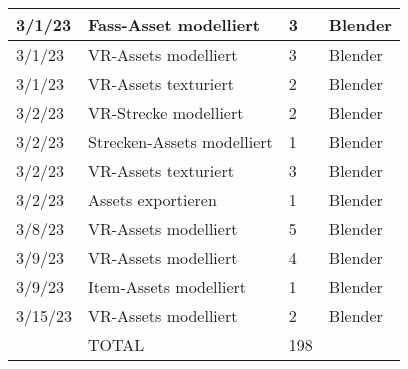 \begin{longtable}{|p{1.5cm}|p{5.5cm}|p{1.2cm}|p{3.2cm}|}
	3/1/23 & Fass-Asset modelliert & 3 & Blender \\ \hline
	3/1/23 & VR-Assets modelliert & 3 & Blender \\ \hline
	3/1/23 & VR-Assets texturiert & 2 & Blender \\ \hline
	3/2/23 & VR-Strecke modelliert & 2 & Blender \\ \hline
	3/2/23 & Strecken-Assets modelliert & 1 & Blender \\ \hline
	3/2/23 & VR-Assets texturiert & 3 & Blender \\ \hline
	3/2/23 & Assets exportieren & 1 & Blender \\ \hline
	3/8/23 & VR-Assets modelliert & 5 & Blender \\ \hline
	3/9/23 & VR-Assets modelliert & 4 & Blender \\ \hline
	3/9/23 & Item-Assets modelliert & 1 & Blender \\ \hline
	3/15/23 & VR-Assets modelliert & 2 & Blender \\ \hline
	~ & TOTAL & 198 & ~ \\ \hline
\end{longtable}